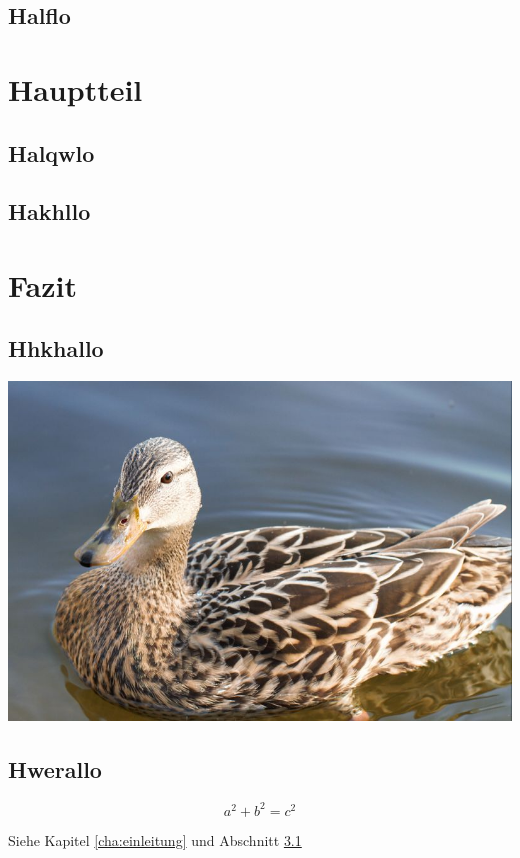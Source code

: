 \documentclass[12pt,ngerman,bibtotoc]{scrreprt}
\begin{document}
\blindtext[10]


\section{Halflo}

\blindtext[10]

\chapter{Hauptteil}

\section{Halqwlo}

\blindtext[10]

\section{Hakhllo}

\blindtext[10]


\chapter{Fazit}

\section{Hhkhallo}\label{sec:sonstwas}

\includegraphics[width=\textwidth]{Bilder/image1}


\blindtext[10]

\section{Hwerallo}

\blindtext[10]

\begin{equation}
a^2+b^2=c^2
\end{equation}

Siehe Kapitel \ref{cha:einleitung} und Abschnitt \ref{sec:sonstwas}
\end{document}
